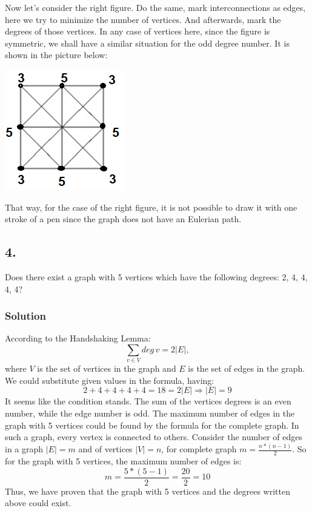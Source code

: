 \documentclass[a4paper]{article}
\begin{document}
\par Now let's consider the right figure. Do the same, mark interconnections as edges, here we try to minimize the number of vertices. And afterwards, mark the degrees of those vertices. In any case of vertices here, since the figure is symmetric, we shall have a similar situation for the odd degree number. It is shown in the picture below: 
\begin{center}
\includegraphics{task3_3.png}  
\end{center}
That way, for the case of the right figure, it is not possible to draw it with one stroke of a pen since the graph does not have an Eulerian path.
\subsection*{4.}
Does there exist a graph with 5 vertices which have the following degrees: 2, 4, 4, 4, 4?

\subsubsection*{Solution}
According to the Handshaking Lemma:
\[
\sum_{v\in{V}} deg\,v = 2|E|,
\]
where \(V\) is the set of vertices in the graph and \(E\) is the set of edges in the graph. We could substitute given values in the formula, having:
\[
2 + 4 + 4 + 4 + 4 = 18 = 2|E| \Rightarrow |E| = 9
\]
It seems like the condition stands. The sum of the vertices degrees is an even number, while the edge number is odd. The maximum number of edges in the graph with 5 vertices could be found by the formula for the complete graph. In such a graph, every vertex is connected to others. Consider the number of edges in a graph \(|E| = m\) and of vertices \(|V| = n\), for complete graph \(m = \frac{n * (n - 1)}{2}\). So for the graph with 5 vertices, the maximum number of edges is:
\[
m = \frac{5 * (5 - 1)}{2} = \frac{20}{2} = 10
\]
Thus, we have proven that the graph with 5 vertices and the degrees written above could exist.
\end{document}
